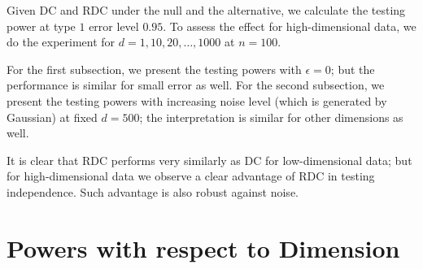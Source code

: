 \documentclass[review]{elsarticle}
\begin{document}
Given DC and RDC under the null and the alternative, we calculate the testing power at type $1$ error level $0.95$. To assess the effect for high-dimensional data, we do the experiment for $d=1,10,20,\ldots,1000$ at $n=100$. 

For the first subsection, we present the testing powers with $\epsilon=0$; but the performance is similar for small error as well. For the second subsection, we present the testing powers with increasing noise level (which is generated by Gaussian) at fixed $d=500$; the interpretation is similar for other dimensions as well. 

It is clear that RDC performs very similarly as DC for low-dimensional data; but for high-dimensional data we observe a clear advantage of RDC in testing independence. Such advantage is also robust against noise.

\section{Powers with respect to Dimension}
\end{document}
